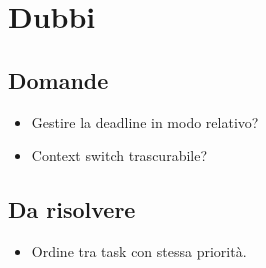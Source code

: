 \chapter{Dubbi}

\section{Domande}
\begin{itemize}
    \item Gestire la deadline in modo relativo?
    \item Context switch trascurabile?
\end{itemize}

\section{Da risolvere}
\begin{itemize}
    \item Ordine tra task con stessa priorità.
\end{itemize}
